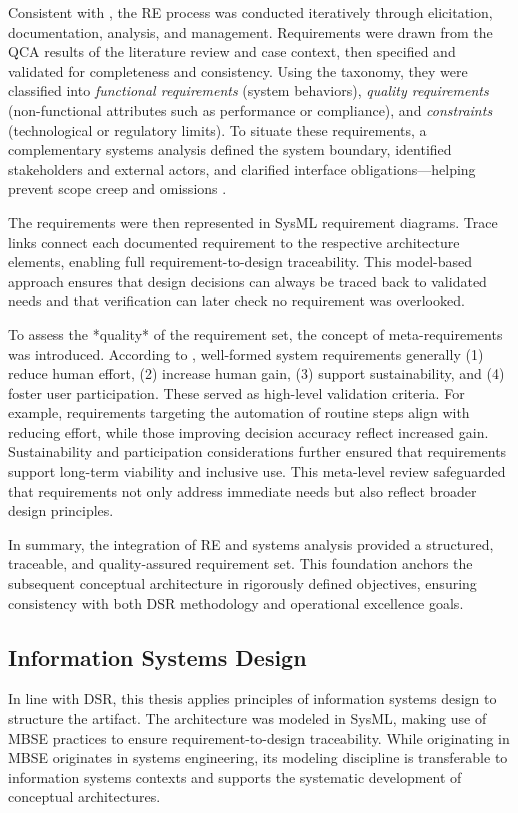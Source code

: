Consistent with \textcite{herrmannGrundlagen2022}, the RE process was conducted iteratively through elicitation, documentation, analysis, and management. Requirements were drawn from the QCA results of the literature review and case context, then specified and validated for completeness and consistency. Using the \textcite{glinzHandbook2020} taxonomy, they were classified into \emph{functional requirements} (system behaviors), \emph{quality requirements} (non-functional attributes such as performance or compliance), and \emph{constraints} (technological or regulatory limits). To situate these requirements, a complementary systems analysis defined the system boundary, identified stakeholders and external actors, and clarified interface obligations—helping prevent scope creep and omissions \parencite{herrmannGrundlagen2022}.

The requirements were then represented in SysML requirement diagrams. Trace links connect each documented requirement to the respective architecture elements, enabling full requirement-to-design traceability. This model-based approach ensures that design decisions can always be traced back to validated needs and that verification can later check no requirement was overlooked.

To assess the *quality* of the requirement set, the concept of meta-requirements was introduced. According to \textcite{kaiyaMeta2018}, well-formed system requirements generally (1) reduce human effort, (2) increase human gain, (3) support sustainability, and (4) foster user participation. These served as high-level validation criteria. For example, requirements targeting the automation of routine steps align with reducing effort, while those improving decision accuracy reflect increased gain. Sustainability and participation considerations further ensured that requirements support long-term viability and inclusive use. This meta-level review safeguarded that requirements not only address immediate needs but also reflect broader design principles.

In summary, the integration of RE and systems analysis provided a structured, traceable, and quality-assured requirement set. This foundation anchors the subsequent conceptual architecture in rigorously defined objectives, ensuring consistency with both DSR methodology and operational excellence goals.

\subsection{Information Systems Design}\label{subsec:isd}
In line with DSR, this thesis applies principles of information systems design to structure the artifact. The architecture was modeled in SysML, making use of MBSE practices to ensure requirement-to-design traceability. While originating in MBSE originates in systems engineering, its modeling discipline is transferable to information systems contexts and supports the systematic development of conceptual architectures.

